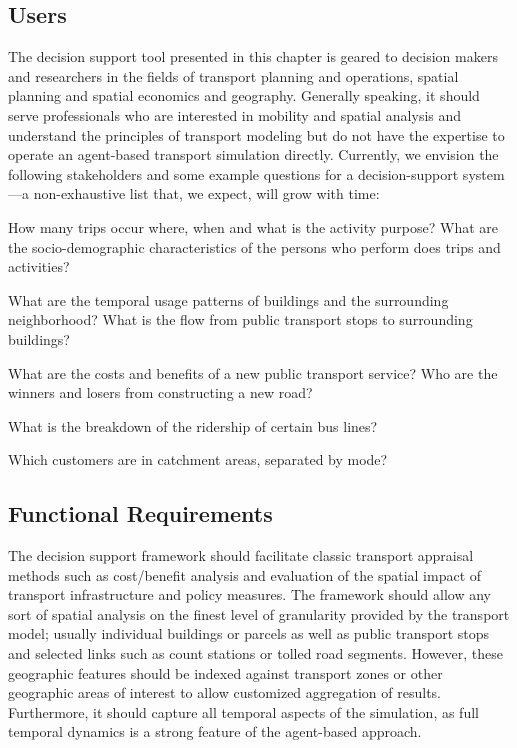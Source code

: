 \subsection{Users}
The decision support tool presented in this chapter is geared to decision makers and researchers in the fields of transport planning and operations, spatial planning and spatial economics and geography. Generally speaking, it should serve professionals who are interested in mobility and spatial analysis and understand the principles of transport modeling but do not have the expertise to operate an agent-based transport simulation directly. Currently, we envision the following stakeholders and some example questions for a decision-support system---a non-exhaustive list that, we expect, will grow with time:
\begin{description}\styleDescription
\item[Transport planners:] How many trips occur where, when and what is the activity purpose?
What are the socio-demographic characteristics of the persons who perform does trips and activities?
\item[Urban Planners:] What are the temporal usage patterns of buildings and the surrounding neighborhood?
What is the flow from public transport stops to surrounding buildings?
\item[Policy-Makers:] What are the costs and benefits of a new public transport service?
Who are the winners and losers from constructing a new road?
\item[Public Transport Operators:] What is the breakdown of the ridership of certain bus lines?
\item[Service Industry:] Which customers are in catchment areas, separated by mode?
\end{description}

\subsection{Functional Requirements}
The decision support framework should facilitate classic transport appraisal methods such as cost/benefit analysis and evaluation of the spatial impact of transport infrastructure and policy measures. The framework should allow any sort of spatial analysis on the finest level of granularity provided by the transport model; usually individual buildings or parcels as well as public transport stops and selected links such as count stations or tolled road segments. However, these geographic features should be indexed against transport zones or other geographic areas of interest to allow customized aggregation of results. Furthermore, it should capture all temporal aspects of the simulation, as full temporal dynamics is a strong feature of the agent-based approach.

